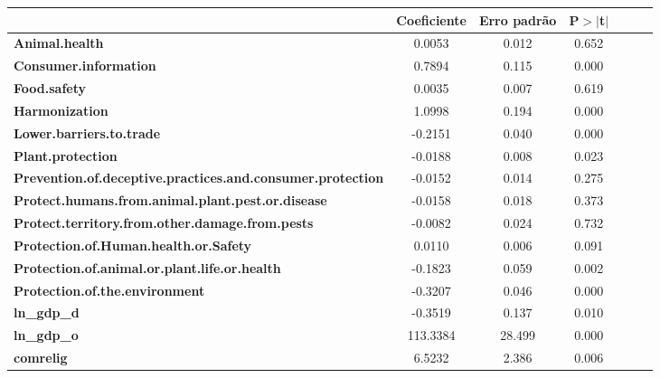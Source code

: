 \begin{center}
\begin{tabular}{lcccccc}
                                                                   & \textbf{Coeficiente} & \textbf{Erro padrão} &\textbf{P$> |$t$|$}\\
\midrule
\textbf{Animal.health}                                             &       0.0053  &        0.012     &        0.652\\
\textbf{Consumer.information}                                      &       0.7894  &        0.115     &        0.000\\
\textbf{Food.safety}                                               &       0.0035  &        0.007     &        0.619\\
\textbf{Harmonization}                                             &       1.0998  &        0.194     &        0.000\\
\textbf{Lower.barriers.to.trade}                                   &      -0.2151  &        0.040     &        0.000\\
\textbf{Plant.protection}                                          &      -0.0188  &        0.008     &        0.023\\
\textbf{Prevention.of.deceptive.practices.and.consumer.protection} &      -0.0152  &        0.014     &        0.275\\
\textbf{Protect.humans.from.animal.plant.pest.or.disease}          &      -0.0158  &        0.018     &        0.373\\
\textbf{Protect.territory.from.other.damage.from.pests}            &      -0.0082  &        0.024     &        0.732\\
\textbf{Protection.of.Human.health.or.Safety}                      &       0.0110  &        0.006     &        0.091\\
\textbf{Protection.of.animal.or.plant.life.or.health}              &      -0.1823  &        0.059     &        0.002\\
\textbf{Protection.of.the.environment}                             &      -0.3207  &        0.046     &        0.000\\
\textbf{ln\_gdp\_d}                                                &      -0.3519  &        0.137     &        0.010\\
\textbf{ln\_gdp\_o}                                                &     113.3384  &       28.499     &        0.000\\
\textbf{comrelig}                                                  &       6.5232  &        2.386     &        0.006\\

\end{tabular}
\end{center}
